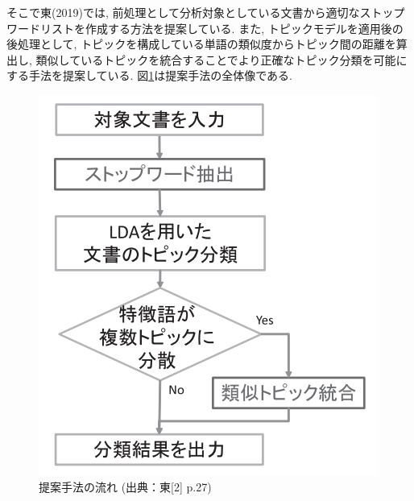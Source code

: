 \documentclass{ltjarticle}
\begin{document}
そこで東(2019)では, 前処理として分析対象としている文書から適切なストップワードリストを作成する方法を提案している. 
また, トピックモデルを適用後の後処理として, トピックを構成している単語の類似度からトピック間の距離を算出し, 
類似しているトピックを統合することでより正確なトピック分類を可能にする手法を提案している. 図\ref{fig:関連研究2提案手法}は提案手法の全体像である. 
\begin{figure}[h]
    \centering
    \includegraphics[]{images/fig2.png}
    \caption{提案手法の流れ (出典：東[2] p.27)}
    \label{fig:関連研究2提案手法}
\end{figure}
\end{document}

